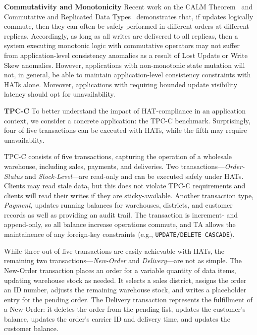 \vspace{.5em}\noindent\textbf{Commutativity and Monotonicity} Recent
work on the CALM Theorem~\cite{calm} and Commutative and Replicated Data
Types~\cite{crdt} demonstrates that, if updates logically commute,
then they can often be safely performed in different orders at
different replicas. Accordingly, as long as all writes are delivered
to all replicas, then a system executing monotonic logic with
commutative operators may not suffer from application-level
consistency anomalies as a result of Lost Update or Write Skew
anomalies. However, applications with non-monotonic state mutation
will not, in general, be able to maintain application-level
consistency constraints with HATs alone. Moreover, applications with
requiring bounded update visibility latency should opt for
unavailability.

\vspace{.5em}\noindent\textbf{TPC-C} To better understand the impact
of HAT-compliance in an application context, we consider a concrete
application: the TPC-C benchmark. Surprisingly, four of five
transactions can be executed with HATs, while the fifth may require
unavailablity.

TPC-C consists of five transactions, capturing the operation of a
wholesale warehouse, including sales, payments, and deliveries. Two
transactions---\textit{Order-Status} and \textit{Stock-Level}---are
read-only and can be executed safely under HATs. Clients may read
stale data, but this does not violate TPC-C requirements and clients
will read their writes if they are sticky-available. Another
transaction type, \textit{Payment}, updates running balances for
warehouses, districts, and customer records as well as providing an
audit trail. The transaction is increment- and append-only, so all
balance increase operations commute, and TA allows the
maintainence of any foreign-key constraints (e.g.,
\texttt{UPDATE/DELETE CASCADE}).

While three out of five transactions are easily achievable with
HATs, the remaining two transactions---\textit{New-Order} and
\textit{Delivery}---are not as simple. The New-Order transaction
places an order for a variable quantity of data items, updating
warehouse stock as needed. It selects a sales district, assigns the
order an ID number, adjusts the remaining warehouse stock, and writes
a placeholder entry for the pending order. The Delivery transaction
represents the fulfillment of a New-Order: it deletes the order from
the pending list, updates the customer's balance, updates the order's
carrier ID and delivery time, and updates the customer balance.

